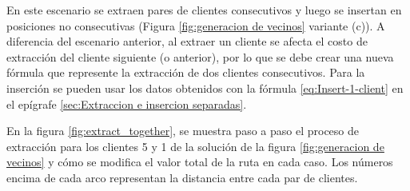 \documentclass[12pt]{report}
\begin{document}
	En este escenario se extraen pares de clientes consecutivos y luego se insertan en posiciones no consecutivas (Figura \ref{fig:generacion de vecinos} variante (c)). A diferencia del escenario anterior, al extraer un cliente se afecta el costo de extracción del cliente siguiente (o anterior), por lo que se debe crear una nueva fórmula que represente la extracción de dos clientes consecutivos. Para la inserción se pueden usar los datos obtenidos con la fórmula \ref{eq:Insert-1-client} en el epígrafe \ref{sec:Extraccion e insercion separadas}.

	En la figura \ref{fig:extract_together}, se muestra paso a paso el proceso de extracción para los clientes 5 y 1 de la solución de la figura \ref{fig:generacion de vecinos} y cómo se modifica el valor total de la ruta en cada caso. Los números encima de cada arco representan la distancia entre cada par de clientes.
\end{document}
